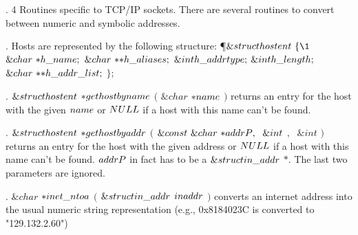 . 4 Routines specific to TCP/IP sockets. There are several routines to
convert
between numeric and symbolic addresses.

\fi

. Hosts are represented by the following structure:
\Y\P $\&{struct}\ \\{hostent}\ \{\1$\6
$\&{char}\ {{*}}\\{h\_name};$\5
\6
$\&{char}\ {{*}}{{*}}\\{h\_aliases};$\5
\6
$\&{int}\ \\{h\_addrtype};$\5
\6
$\&{int}\ \\{h\_length};$\5
\6
$\&{char}\ {{*}}{{*}}\\{h\_addr\_list};$\5
\2\6
$\};$\par
\fi

. \CD{}$\&{struct}\ \\{hostent}$ ${{*}}\\{gethostbyname}$ $($ $\&{char}$
${{*}}\\{name}$ $)$\DC{} returns an entry for the host
with the given \CD{}$\\{name}$\DC{} or \CD{}$\\{NULL}$\DC{} if a host with this
name can't be found.

\fi

. \CD{}$\&{struct}\ \\{hostent}$ ${{*}}\\{gethostbyaddr}$ $($ $\&{const}\ %
\&{char}\ {{*}}\\{addrP},\;\ \&{int}$ $,\;$ $\&{int}$ $)$\DC{} returns an
entry for the host with the given address or \CD{}$\\{NULL}$\DC{} if a host
with this name
can't be found. \CD{}$\\{addrP}$\DC{} in fact has to be a \CD{}$\&{struct}\ %
\\{in\_addr}$ ${*}$\DC{}. The last two
parameters are ignored.

\fi

. \CD{}$\&{char}$ ${{*}}\\{inet\_ntoa}$ $($ $\&{struct}\ \\{in\_addr}$ $%
\\{inaddr}$ $)$\DC{} converts an internet address into
the usual numeric string representation (e.g., 0x8184023C is converted to
"129.132.2.60")

